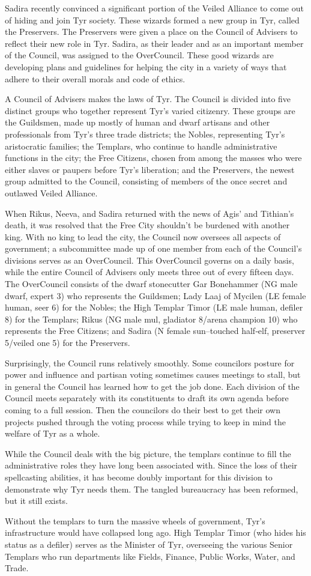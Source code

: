 {	Sadira recently convinced a significant portion of the Veiled Alliance to come out of hiding and join Tyr society. These wizards formed a new group in Tyr, called the Preservers. The Preservers were given a place on the Council of Advisers to reflect their new role in Tyr. Sadira, as their leader and as an important member of the Council, was assigned to the OverCouncil. These good wizards are developing plans and guidelines for helping the city in a variety of ways that adhere to their overall morals and code of ethics.
}
{
	A Council of Advisers makes the laws of Tyr. The Council is divided into five distinct groups who together represent Tyr’s varied citizenry. These groups are the Guildsmen, made up mostly of human and dwarf artisans and other professionals from Tyr’s three trade districts; the Nobles, representing Tyr’s aristocratic families; the Templars, who continue to handle administrative functions in the city; the Free Citizens, chosen from among the masses who were either slaves or paupers before Tyr’s liberation; and the Preservers, the newest group admitted to the Council, consisting of members of the once secret and outlawed Veiled Alliance.

	When Rikus, Neeva, and Sadira returned with the news of Agis’ and Tithian’s death, it was resolved that the Free City shouldn’t be burdened with another king. With no king to lead the city, the Council now oversees all aspects of government; a subcommittee made up of one member from each of the Council’s divisions serves as an OverCouncil. This OverCouncil governs on a daily basis, while the entire Council of Advisers only meets three out of every fifteen days. The OverCouncil consists of the dwarf stonecutter Gar Bonehammer (NG male dwarf, expert 3) who represents the Guildsmen; Lady Laaj of Mycilen (LE female human, seer 6) for the Nobles; the High Templar Timor (LE male human, defiler 8) for the Templars; Rikus (NG male mul, gladiator 8/arena champion 10) who represents the Free Citizens; and Sadira (N female sun–touched half‐elf, preserver 5/veiled one 5) for the Preservers.

	Surprisingly, the Council runs relatively smoothly. Some councilors posture for power and influence and partisan voting sometimes causes meetings to stall, but in general the Council has learned how to get the job done. Each division of the Council meets separately with its constituents to draft its own agenda before coming to a full session. Then the councilors do their best to get their own projects pushed through the voting process while trying to keep in mind the welfare of Tyr as a whole.

	While the Council deals with the big picture, the templars continue to fill the administrative roles they have long been associated with. Since the loss of their spellcasting abilities, it has become doubly important for this division to demonstrate why Tyr needs them. The tangled bureaucracy has been reformed, but it still exists.

	Without the templars to turn the massive wheels of government, Tyr’s infrastructure would have collapsed long ago. High Templar Timor (who hides his status as a defiler) serves as the Minister of Tyr, overseeing the various Senior Templars who run departments like Fields, Finance, Public Works, Water, and Trade.
}
